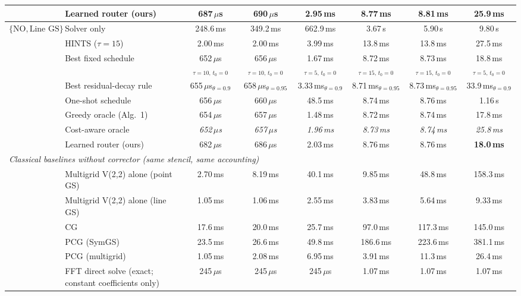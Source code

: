 {\begin{tabular}{llcccccc}
 & Learned router (ours) & 687\,$\mu$s & 690\,$\mu$s & 2.95\,ms & 8.77\,ms & 8.81\,ms & 25.9\,ms \\
\midrule
$\{\mathrm{NO}, \text{Line GS}\}$ & Solver only & 248.6\,ms & 349.2\,ms & 662.9\,ms & 3.67\,s & 5.90\,s & 9.80\,s \\
 & HINTS ($\tau{=}15$) & 2.00\,ms & 2.00\,ms & 3.99\,ms & 13.8\,ms & 13.8\,ms & 27.5\,ms \\
 & Best fixed schedule & 652\,$\mu$s$_{\tau{=}10,\,t_0{=}0}$ & 656\,$\mu$s$_{\tau{=}10,\,t_0{=}0}$ & 1.67\,ms$_{\tau{=}5,\,t_0{=}0}$ & 8.72\,ms$_{\tau{=}15,\,t_0{=}0}$ & 8.73\,ms$_{\tau{=}15,\,t_0{=}0}$ & 18.8\,ms$_{\tau{=}5,\,t_0{=}0}$ \\
 & Best residual-decay rule & 655\,$\mu$s$_{\theta{=}0.9}$ & 658\,$\mu$s$_{\theta{=}0.95}$ & 3.33\,ms$_{\theta{=}0.9}$ & 8.71\,ms$_{\theta{=}0.95}$ & 8.73\,ms$_{\theta{=}0.95}$ & 33.9\,ms$_{\theta{=}0.9}$ \\
 & One-shot schedule & 656\,$\mu$s & 660\,$\mu$s & 48.5\,ms & 8.74\,ms & 8.76\,ms & 1.16\,s \\
 & Greedy oracle (Alg.~1) & 654\,$\mu$s & 657\,$\mu$s & 1.48\,ms & 8.72\,ms & 8.74\,ms & 17.8\,ms \\
 & Cost-aware oracle & \textit{652\,$\mu$s} & \textit{657\,$\mu$s} & \textit{1.96\,ms} & \textit{8.73\,ms} & \textit{8.74\,ms} & \textit{25.8\,ms} \\
 & Learned router (ours) & 682\,$\mu$s & 686\,$\mu$s & 2.03\,ms & 8.76\,ms & 8.76\,ms & \textbf{18.0\,ms} \\
\midrule
\multicolumn{8}{l}{\emph{Classical baselines without corrector (same stencil, same accounting)}} \\ \midrule
 & Multigrid V(2,2) alone (point GS) & 2.70\,ms & 8.19\,ms & 40.1\,ms & 9.85\,ms & 48.8\,ms & 158.3\,ms \\
 & Multigrid V(2,2) alone (line GS) & 1.05\,ms & 1.06\,ms & 2.55\,ms & 3.83\,ms & 5.64\,ms & 9.33\,ms \\
 & CG & 17.6\,ms & 20.0\,ms & 25.7\,ms & 97.0\,ms & 117.3\,ms & 145.0\,ms \\
 & PCG (SymGS) & 23.5\,ms & 26.6\,ms & 49.8\,ms & 186.6\,ms & 223.6\,ms & 381.1\,ms \\
 & PCG (multigrid) & 1.05\,ms & 2.08\,ms & 6.95\,ms & 3.91\,ms & 11.3\,ms & 26.4\,ms \\
 & FFT direct solve (exact; constant coefficients only) & 245\,$\mu$s & 245\,$\mu$s & 245\,$\mu$s & 1.07\,ms & 1.07\,ms & 1.07\,ms \\
\bottomrule
\end{tabular}}
